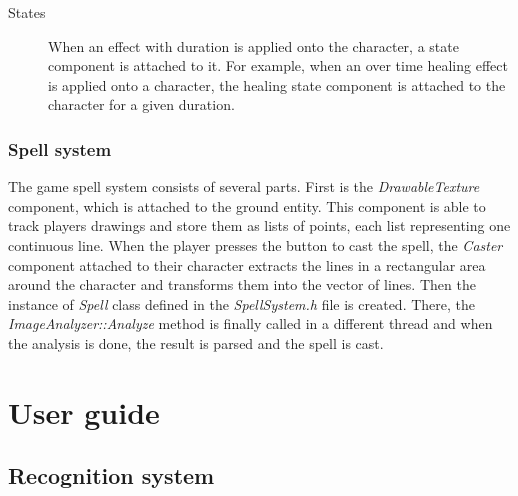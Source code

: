 \begin{description}
\begin{description}
\begin{description}
\item [States] When an effect with duration is applied onto the character, a state component is attached to it. For example, when an over time healing effect is applied onto a character, the healing state component is attached to the character for a given duration.

\end{description}

\subsection{Spell system}
The game spell system consists of several parts. First is the \emph{DrawableTexture} component, which is attached to the ground entity. This component is able to track players drawings and store them as lists of points, each list representing one continuous line. When the player presses the button to cast the spell, the \emph{Caster} component attached to their character extracts the lines in a rectangular area around the character and transforms them into the vector of lines. Then the instance of \emph{Spell} class defined in the \emph{SpellSystem.h} file is created. There, the \emph{ImageAnalyzer::Analyze} method is finally called in a different thread and when the analysis is done, the result is parsed and the spell is cast.

\chapter{User guide}
\section{Recognition system}

\end{description}
\end{description}
